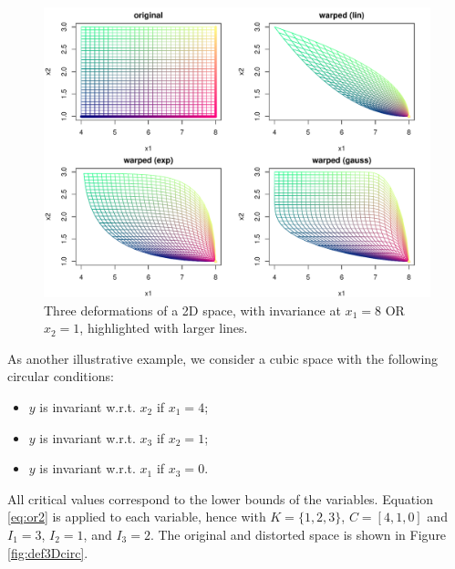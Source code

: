 \begin{figure}[!ht]
\centering
 \includegraphics[width=.8\textwidth]{def2DOR.pdf}
 \caption{Three deformations of a 2D space, with invariance at $x_1=8$ OR $x_2=1$, highlighted with larger lines.}\label{fig:def2DOR}
\end{figure}
% 
% 

As another illustrative example, we consider a cubic space with the following circular conditions:
\begin{itemize}
 \item $y$ is invariant w.r.t. $x_2$ if $x_1=4$;
 \item $y$ is invariant w.r.t. $x_3$ if $x_2=1$;
 \item $y$ is invariant w.r.t. $x_1$ if $x_3=0$.
\end{itemize}
All critical values correspond to the lower bounds of the variables.
Equation \ref{eq:or2} is applied to each variable, hence with $K=\{1,2,3\}$, $C=[4,1,0]$ and $I_1=3$, $I_2=1$, and $I_3=2$. 
The original and distorted space is shown in Figure \ref{fig:def3Dcirc}.

